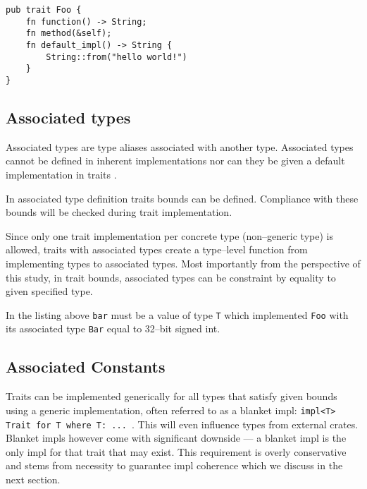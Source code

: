 \begin{lstlisting}
pub trait Foo {
    fn function() -> String;
    fn method(&self);
    fn default_impl() -> String {
        String::from("hello world!")
    }
}

\end{lstlisting}

\subsection{Associated types}

Associated types are type aliases associated with another type. Associated types cannot be defined in inherent implementations nor can they be given a default implementation in traits \cite{rustreference}.



In associated type definition traits bounds can be defined. Compliance with these bounds will be checked during trait implementation.



Since only one trait implementation per concrete type (non--generic type) is allowed, traits with associated types create a type--level function from implementing types to associated types.
Most importantly from the perspective of this study, in trait bounds, associated types can be constraint by equality to given specified type.



In the listing above \texttt{bar} must be a value of type \texttt{T} which implemented \texttt{Foo} with its associated type \texttt{Bar} equal to 32--bit signed int.

\subsection{Associated Constants}

Traits can be implemented generically for all types that satisfy given bounds using a generic implementation, often referred to as a blanket impl:
\texttt{impl<T> Trait for T where T: ... }.
This will even influence types from external crates. Blanket impls however come with significant downside --- a blanket impl is the only impl for that trait that may exist.
This requirement is overly conservative and stems from necessity to guarantee impl coherence which we discuss in the next section.

